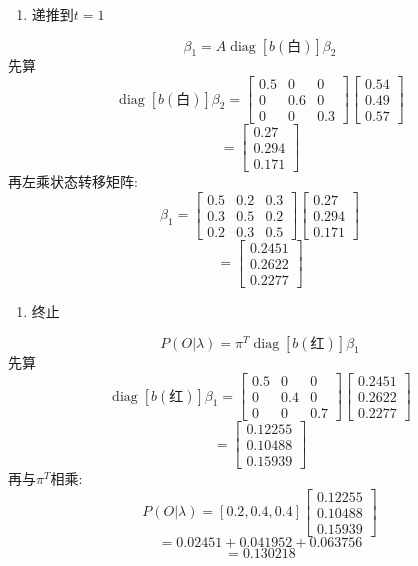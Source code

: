 \begin{enumerate}
\item[3.] 递推到$t=1$
\end{enumerate}
\[
\beta_1 = A \operatorname{diag}[b(\text{白})] \beta_2
\]
先算
\[
\operatorname{diag}[b(\text{白})] \beta_2
    =
    \begin{bmatrix}0.5 & 0 & 0 \\ 0 & 0.6 & 0 \\ 0 & 0 & 0.3\end{bmatrix}
    \begin{bmatrix}0.54 \\ 0.49 \\ 0.57\end{bmatrix}
\]
\[
= \begin{bmatrix}0.27 \\ 0.294 \\ 0.171\end{bmatrix}
\]
再左乘状态转移矩阵:
\[
\beta_1
    =
    \begin{bmatrix}0.5 & 0.2 & 0.3 \\ 0.3 & 0.5 & 0.2 \\ 0.2 & 0.3 & 0.5\end{bmatrix}
    \begin{bmatrix}0.27 \\ 0.294 \\ 0.171\end{bmatrix}
\]
\[
= \begin{bmatrix}0.2451 \\ 0.2622 \\ 0.2277\end{bmatrix}
\]

\begin{enumerate}
\item[4.] 终止
\end{enumerate}
\[
P(O | \lambda) = \pi^T \operatorname{diag}[b(\text{红})] \beta_1
\]
先算
\[
\operatorname{diag}[b(\text{红})] \beta_1
    =
    \begin{bmatrix}0.5 & 0 & 0 \\ 0 & 0.4 & 0 \\ 0 & 0 & 0.7\end{bmatrix}
    \begin{bmatrix}0.2451 \\ 0.2622 \\ 0.2277\end{bmatrix}
\]
\[
= \begin{bmatrix}0.12255 \\ 0.10488 \\ 0.15939\end{bmatrix}
\]
再与$\pi^T$相乘:
\[
P(O | \lambda)
    = [0.2, 0.4, 0.4] \begin{bmatrix}0.12255 \\ 0.10488 \\ 0.15939\end{bmatrix}
\]
\[
= 0.02451 + 0.041952 + 0.063756
\]
\[
= 0.130218
\]

